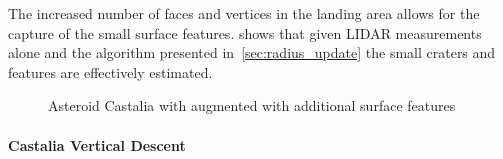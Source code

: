 \documentclass[letterpaper, paper,11pt]{AAS}		%
\begin{document}
The increased number of faces and vertices in the landing area allows for the capture of the small surface features.
 shows that given LIDAR measurements alone and the algorithm presented in~\cref{sec:radius_update} the small craters and features are effectively estimated.
\begin{figure}[htbp]
    \centering
    \caption{Asteroid Castalia with augmented with additional surface features~\label{fig:castalia_refinement}}
\end{figure}

\paragraph{Castalia Vertical Descent}
\end{document}
